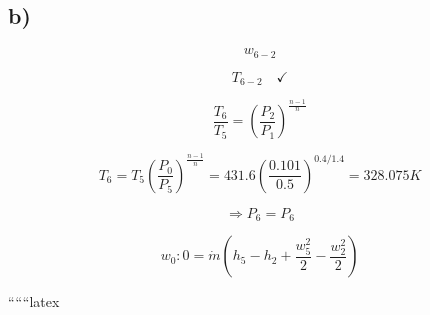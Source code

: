 

\subsection*{b)}

\[
w_{6-2}
\]

\[
T_{6-2} \quad \checkmark
\]

\[
\frac{T_6}{T_5} = \left( \frac{P_2}{P_1} \right)^{\frac{n-1}{n}}
\]

\[
T_6 = T_5 \left( \frac{P_0}{P_5} \right)^{\frac{n-1}{n}} = 431.6 \left( \frac{0.101}{0.5} \right)^{0.4/1.4} = \boxed{328.075 K}
\]

\[
\Rightarrow P_6 = P_6
\]

\[
w_0 : 0 = \dot{m} (h_5 - h_2 + \frac{w_5^2}{2} - \frac{w_2^2}{2})
\]

``````latex
